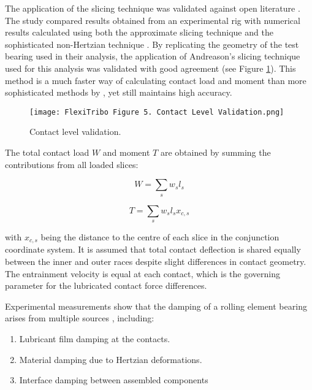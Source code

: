 The application of the slicing technique was validated against open literature \cite{DeMul1989_2}. The study compared results obtained from an experimental rig with numerical results calculated using both the approximate slicing technique and the sophisticated non-Hertzian technique \cite{DeMul1986}. By replicating the geometry of the test bearing used in their analysis, the application of Andreason’s slicing technique used for this analysis was validated with good agreement (see Figure \ref{Contact level validation}). This method is a much faster way of calculating contact load and moment than more sophisticated methods by \cite{DeMul1989_2}, yet still maintains high accuracy.

\begin{figure}
	\centering  
	\texttt{[image: FlexiTribo Figure 5. Contact Level Validation.png]}
	\caption{Contact level validation.}
	\label{Contact level validation}
\end{figure} 

The total contact load $W$ and moment $T$ are obtained by summing the contributions from all loaded slices:

\begin{equation}\label{Total contact load flexitribo}
	W=\sum_s w_s l_s
\end{equation}

\begin{equation}\label{Total contact torque flexitribo}
	T=\sum_s w_s l_s x_{c, s}
\end{equation}

with $x_{c, s}$ being the distance to the centre of each slice in the conjunction coordinate system. It is assumed that total contact deflection is shared equally between the inner and outer races despite slight differences in contact geometry. The entrainment velocity is equal at each contact, which is the governing parameter for the lubricated contact force differences.

Experimental measurements show that the damping of a rolling element bearing arises from multiple sources \cite{Dietl1997}, including:
 
\begin{enumerate}
	\item Lubricant film damping at the contacts.
	\item Material damping due to Hertzian deformations.
	\item Interface damping between assembled components
\end{enumerate}

